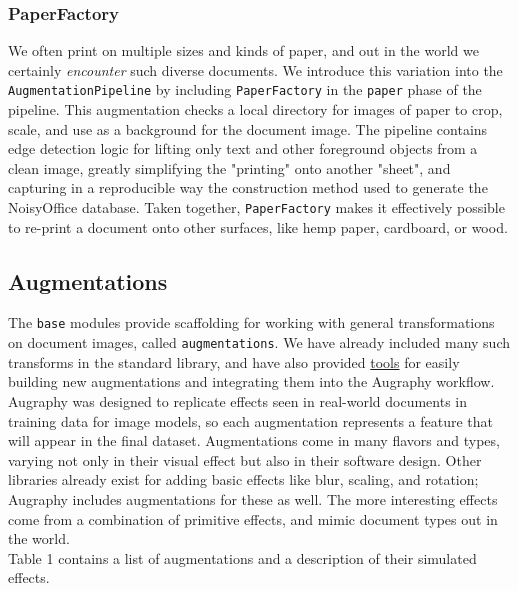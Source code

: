 \documentclass[runningheads]{article}
\begin{document}
\subsubsection{PaperFactory}
\label{sec:org16fabe6}
We often print on multiple sizes and kinds of paper, and out in the world we certainly \emph{encounter} such diverse documents. We introduce this variation into the \texttt{AugmentationPipeline} by including \texttt{PaperFactory} in the \texttt{paper} phase of the pipeline. This augmentation checks a local directory for images of paper to crop, scale, and use as a background for the document image. The pipeline contains edge detection logic for lifting only text and other foreground objects from a clean image, greatly simplifying the "printing" onto another "sheet", and capturing in a reproducible way the construction method used to generate the NoisyOffice database. Taken together, \texttt{PaperFactory} makes it effectively possible to re-print a document onto other surfaces, like hemp paper, cardboard, or wood.

\subsection{Augmentations}
\label{sec:orgea493da}
The \texttt{base} modules provide scaffolding for working with general transformations on document images, called \texttt{augmentations}. We have already included many such transforms in the standard library, and have also provided \hyperref[sec:org8b47a22]{tools} for easily building new augmentations and integrating them into the Augraphy workflow.\\

Augraphy was designed to replicate effects seen in real-world documents in training data for image models, so each augmentation represents a feature that will appear in the final dataset. Augmentations come in many flavors and types, varying not only in their visual effect but also in their software design. Other libraries already exist for adding basic effects like blur, scaling, and rotation; Augraphy includes augmentations for these as well. The more interesting effects come from a combination of primitive effects, and mimic document types out in the world.\\

Table 1 contains a list of augmentations and a description of their simulated effects.
\end{document}
